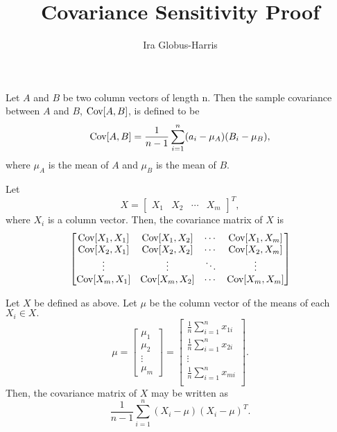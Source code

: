 \documentclass[11pt, oneside]{article}   	%
\title{Covariance Sensitivity Proof}
\author{Ira Globus-Harris}
\begin{document}
\maketitle

\begin{definition}
Let $A$ and $B$ be two column vectors of length n. Then the sample covariance between $A$ and $B$, $\text{Cov}[A,B]$, is defined to be 
$$ \text{Cov}[A,B] = \frac{1}{n-1} \sum_{i=1}^n (a_i - \mu_A)(B_i - \mu_B),$$
where $\mu_A$ is the mean of $A$ and $\mu_B$ is the mean of $B$.
\end{definition}

\begin{definition}
Let 
$$
X = 
\begin{bmatrix}
X_1 & X_2 & \cdots & X_m
\end{bmatrix}^T,
$$
where $X_i$ is a column vector.
Then, the covariance matrix of $X$ is
$$
\begin{bmatrix}
\text{Cov}[X_1,X_1] & \text{Cov}[X_1,X_2] & \cdots & \text{Cov}[X_1, X_m]\\
\text{Cov}[X_2,X_1] & \text{Cov}[X_2, X_2] & \cdots & \text{Cov}[X_2,X_m]\\
\vdots & \vdots & \ddots & \vdots \\
\text{Cov}[X_m, X_1] & \text{Cov}[X_m,X_2] & \cdots & \text{Cov}[X_m,X_m]
\end{bmatrix}
$$
\end{definition}

\begin{lemma}
\label{lemma:covarmatrix}
Let $X$ be defined as above.
Let $\mu$ be the column vector of the means of each $X_i \in X.$
$$ \mu = 
\begin{bmatrix}
\mu_1 \\
\mu_2 \\
\vdots \\
\mu_m
\end{bmatrix}
= 
\begin{bmatrix}
\frac{1}{n} \sum_{i=1}^n x_{1i} \\[6pt]
\frac{1}{n} \sum_{i=1}^n x_{2i} \\[6pt]
\vdots\\
\frac{1}{n} \sum_{i=1}^n x_{mi} \\
\end{bmatrix}.
$$
Then, the covariance matrix of $X$ may be written as 
$$\frac{1}{n-1}\sum_{i=1}^n (X_i - \mu)(X_i-\mu)^T.$$
\end{lemma}
\end{document}
